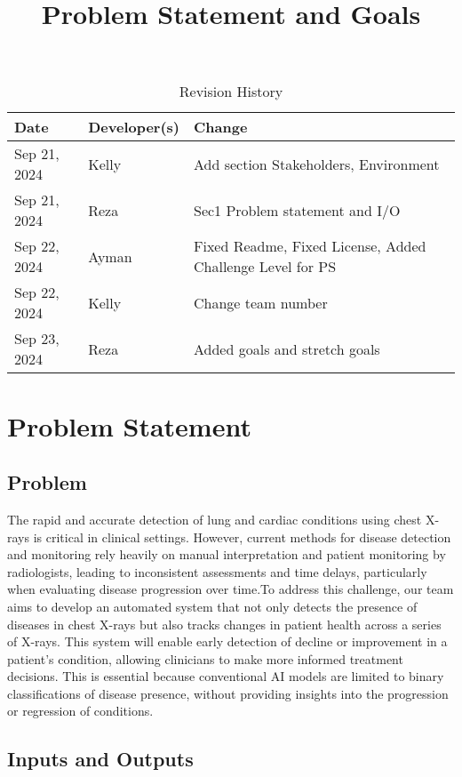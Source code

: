 \documentclass{article}
\title{Problem Statement and Goals\\\progname}
\author{\authname}
\date{}
\begin{document}
\maketitle

\begin{table}[hp]
\caption{Revision History} \label{TblRevisionHistory}
\begin{tabularx}{\textwidth}{llX}
\toprule
\textbf{Date} & \textbf{Developer(s)} & \textbf{Change}\\
\midrule
Sep 21, 2024 & Kelly & Add section Stakeholders, Environment\\
Sep 21, 2024 & Reza & Sec1 Problem statement and I/O\\
Sep 22, 2024 & Ayman & Fixed Readme, Fixed License, Added Challenge Level for PS\\
Sep 22, 2024 & Kelly & Change team number\\
Sep 23, 2024 & Reza & Added goals and stretch goals\\
\bottomrule
\end{tabularx}
\end{table}
\newpage
\section{Problem Statement}
\subsection{Problem}
The rapid and accurate detection of lung and cardiac conditions using chest X-rays is critical in clinical settings. However, current methods for disease detection and monitoring rely heavily on manual interpretation and patient monitoring by radiologists, leading to inconsistent assessments and time delays, particularly when evaluating disease progression over time.To address this challenge, our team aims to develop an automated system that not only detects the presence of diseases in chest X-rays but also tracks changes in patient health across a series of X-rays. This system will enable early detection of decline or improvement in a patient's condition, allowing clinicians to make more informed treatment decisions. This is essential because conventional AI models are limited to binary classifications of disease presence, without providing insights into the progression or regression of conditions.
\subsection{Inputs and Outputs}
\end{document}
